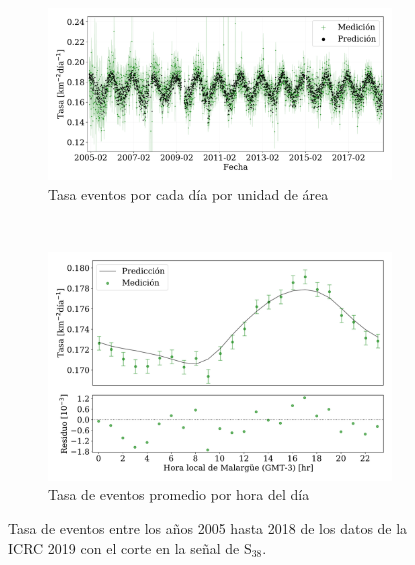    \begin{figure}[H]
    \centering
       \begin{subfigure}[b]{0.9\textwidth}
       \includegraphics[width=\textwidth]{Graphs/rate_dayly/0EeV_ICRC_2019_S38_05_18.pdf}
       \caption{Tasa eventos por cada día por unidad de área}
       \label{fig:rate_day_ICRC_19_S38_05_18}
       \end{subfigure}\\%
       \begin{subfigure}[b]{0.9\textwidth}
       \includegraphics[width=\textwidth]{Graphs/rate_hour_of_the_day/S38_above_0EeV_hour_of_the_day.pdf}
       \caption{Tasa de eventos promedio por hora del día}
       \label{fig:rate_2015_ICRC_19_S38_05_18}
       \end{subfigure}%
       \caption{Tasa de eventos entre los años 2005 hasta 2018 de los datos de la ICRC 2019 con el corte en la señal de S$_{38}$.}\label{fig:rate_new_18_S38}
   \end{figure}

